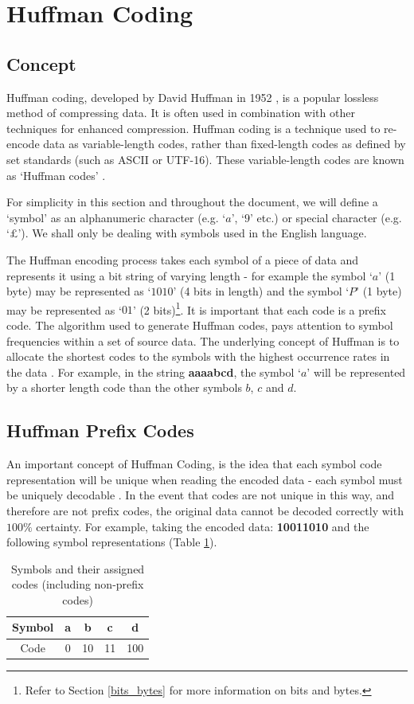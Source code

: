 \documentclass[12pt]{article}
\begin{document}
\clearpage
\section{Huffman Coding}
\subsection{Concept}
Huffman coding, developed by David Huffman in 1952 \citep{huffman_paper}, is a popular lossless method of compressing data. It is often used in combination with other techniques for enhanced compression. Huffman coding is a technique used to re-encode data as variable-length codes, rather than fixed-length codes as defined by set standards (such as ASCII or UTF-16). These variable-length codes are known as `Huffman codes' \citep{dc_complete_ref}.

For simplicity in this section and throughout the document, we will define a `symbol' as an alphanumeric character (e.g. `$a$', `$9$' etc.) or special character (e.g. `$\pounds$'). We shall only be dealing with symbols used in the English language. 

The Huffman encoding process takes each symbol of a piece of data and represents it using a bit string of varying length - for example the symbol `$a$' (1 byte) may be represented as `$1010$' (4 bits in length) and the symbol `$P$' (1 byte) may be represented as `$01$' (2 bits)\footnote{Refer to Section \ref{bits_bytes} for more information on bits and bytes.}. It is important that each code is a prefix code. The algorithm used to generate Huffman codes, pays attention to symbol frequencies within a set of source data. The underlying concept of Huffman is to allocate the shortest codes to the symbols with the highest occurrence rates in the data \citep{huffman_paper}. For example, in the string \textbf{aaaabcd}, the symbol `$a$' will be represented by a shorter length code than the other symbols $b$, $c$ and $d$.

\subsection{Huffman Prefix Codes}
An important concept of Huffman Coding, is the idea that each symbol code representation will be unique when reading the encoded data - each symbol must be uniquely decodable \citep[p.~13]{ipu_dc}. In the event that codes are not unique in this way, and therefore are not prefix codes, the original data cannot be decoded correctly with $100\%$ certainty. For example, taking the encoded data: \textbf{10011010} and the following symbol representations (Table \ref{sym_non_prefix}).
\begin{table}[H]
	\centering
	\begin{tabular}{|c|c|c|c|c|}
		\hline
		Symbol & a & b & c & d\\
		\hline
		Code & 0 & 10 & 11 & 100\\
		\hline
	\end{tabular}
	\caption{Symbols and their assigned codes (including non-prefix codes)}
	\label{sym_non_prefix}
\end{table}
\end{document}
